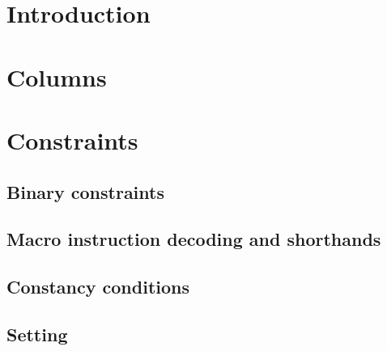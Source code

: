 \section{Introduction}                                                      \label{ec data: intro}                                              
\section{Columns}                                                           \label{ec data: columns}                                            
                                                                                                                                                
\section{Constraints}                                                                                                                           
\subsection{Binary constraints}                                             \label{ec data: binary}                                             
\subsection{Macro instruction decoding and shorthands}                      \label{ec data: type constraints}                                   
\subsection{Constancy conditions}                                           \label{ec data: counter constancies}                                
\subsection{Setting \indexMax{}}                                            \label{ec data: setting index max}                                  
